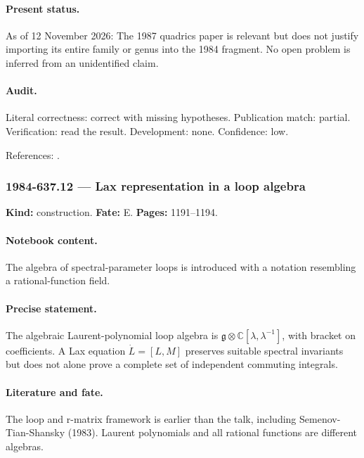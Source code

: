 \paragraph{Present status.} As of 12 November 2026: The 1987 quadrics paper is relevant but does not justify importing its entire family or genus into the 1984 fragment. No open problem is inferred from an unidentified claim.

\paragraph{Audit.} Literal correctness: correct with missing hypotheses. Publication match: partial. Verification: read the result. Development: none. Confidence: low.

\noindent References: \citep{adler1987quadrics}.\par

\subsubsection{1984-637.12 --- Lax representation in a loop algebra}

\label{item:1984-637.12}

\noindent\textbf{Kind:} construction. \textbf{Fate:} E. \textbf{Pages:} 1191--1194.\par

\paragraph{Notebook content.} The algebra of spectral-parameter loops is introduced with a notation resembling a rational-function field.

\paragraph{Precise statement.} The algebraic Laurent-polynomial loop algebra is \(\mathfrak g\otimes\mathbb C[\lambda,\lambda^{-1}]\), with bracket on coefficients. A Lax equation \(\dot L=[L,M]\) preserves suitable spectral invariants but does not alone prove a complete set of independent commuting integrals.

\paragraph{Literature and fate.} The loop and r-matrix framework is earlier than the talk, including Semenov-Tian-Shansky (1983). Laurent polynomials and all rational functions are different algebras.

